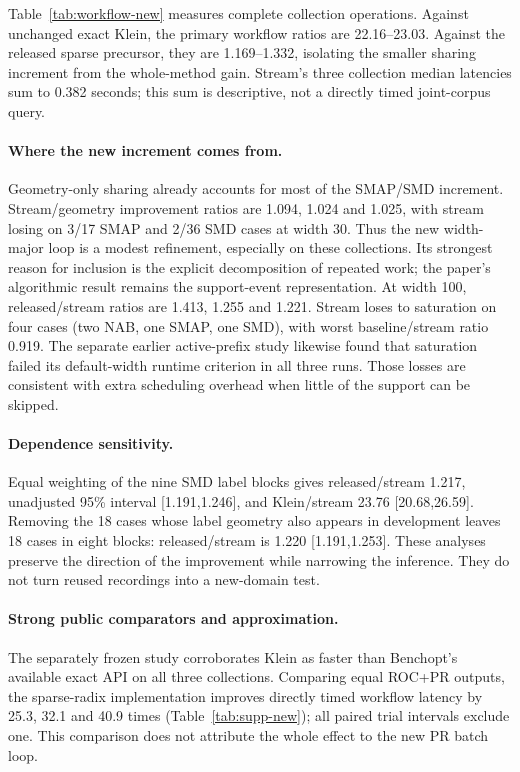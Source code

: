 Table~\ref{tab:workflow-new} measures complete collection operations. Against
unchanged exact Klein, the primary workflow ratios are 22.16--23.03. Against
the released sparse precursor, they are 1.169--1.332, isolating the smaller
sharing increment from the whole-method gain. Stream's three collection
median latencies sum to 0.382 seconds; this sum is descriptive, not a directly
timed joint-corpus query.

\paragraph{Where the new increment comes from.}
Geometry-only sharing already accounts for most of the SMAP/SMD increment.
Stream/geometry improvement ratios are 1.094, 1.024 and 1.025, with stream
losing on 3/17 SMAP and 2/36 SMD cases at width 30. Thus the new width-major
loop is a modest refinement, especially on these collections. Its strongest
reason for inclusion is the explicit decomposition of repeated work; the
paper's algorithmic result remains the support-event representation.
At width 100, released/stream ratios are 1.413, 1.255 and 1.221. Stream loses
to saturation on four cases (two NAB, one SMAP, one SMD), with worst
baseline/stream ratio 0.919. The separate earlier active-prefix study likewise
found that saturation failed its default-width runtime criterion in all three runs.
Those losses are consistent with extra scheduling overhead when little of the
support can be skipped.

\paragraph{Dependence sensitivity.}
Equal weighting of the nine SMD label blocks gives released/stream 1.217,
unadjusted 95\% interval [1.191,1.246], and Klein/stream 23.76 [20.68,26.59].
Removing the 18 cases whose label geometry also appears in development leaves
18 cases in eight blocks: released/stream is 1.220 [1.191,1.253]. These analyses
preserve the direction of the improvement while narrowing the inference. They
do not turn reused recordings into a new-domain test.

\paragraph{Strong public comparators and approximation.}
The separately frozen study corroborates Klein as faster than Benchopt's
available exact API on all three collections. Comparing equal ROC+PR outputs,
the sparse-radix implementation improves directly timed workflow latency by
25.3, 32.1 and 40.9 times (Table~\ref{tab:supp-new}); all paired trial intervals
exclude one. This comparison does not attribute the whole effect to the new
PR batch loop.

